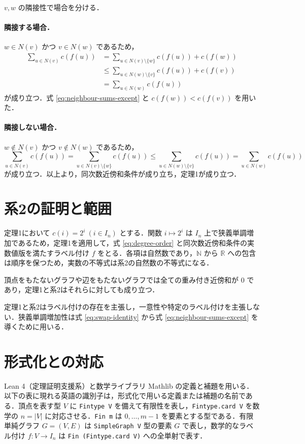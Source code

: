 \documentclass[lualatex,article]{jlreq}
\theoremstyle{jremark}
\begin{document}
$v,w$ の隣接性で場合を分ける．

\paragraph{隣接する場合．}
$w\in N(v)$ かつ $v\in N(w)$ であるため，
\[
\begin{aligned}
  \sum_{u\in N(v)}c(f(u))
  &=\sum_{u\in N(v)\setminus\{w\}}c(f(u))+c(f(w))\\
  &\leq\sum_{u\in N(w)\setminus\{v\}}c(f(u))+c(f(v))\\
  &=\sum_{u\in N(w)}c(f(u))
\end{aligned}
\]
が成り立つ．式 \eqref{eq:neighbour-sums-except} と $c(f(w))<c(f(v))$ を用いた．

\paragraph{隣接しない場合．}
$w\notin N(v)$ かつ $v\notin N(w)$ であるため，
\[
  \sum_{u\in N(v)}c(f(u))
  =\sum_{u\in N(v)\setminus\{w\}}c(f(u))
  \leq\sum_{u\in N(w)\setminus\{v\}}c(f(u))
  =\sum_{u\in N(w)}c(f(u))
\]
が成り立つ．以上より，同次数近傍和条件が成り立ち，定理1が成り立つ．

\section{系2の証明と範囲}

定理1において $c(i)=2^i\ (i\in I_n)$ とする．関数 $i\mapsto2^i$ は $I_n$ 上で狭義単調増加であるため，定理1を適用して，式 \eqref{eq:degree-order} と同次数近傍和条件の実数値版を満たすラベル付け $f$ をとる．各項は自然数であり，$\mathbb N$ から $\mathbb R$ への包含は順序を保つため，実数の不等式は系2の自然数の不等式になる．

頂点をもたないグラフや辺をもたないグラフでは全ての重み付き近傍和が $0$ であり，定理1と系2はそれらに対しても成り立つ．

定理1と系2はラベル付けの存在を主張し，一意性や特定のラベル付けを主張しない．狭義単調増加性は式 \eqref{eq:swap-identity} から式 \eqref{eq:neighbour-sums-except} を導くために用いる．

\section{形式化との対応}

Lean 4（定理証明支援系）と数学ライブラリ Mathlib の定義と補題を用いる．以下の表に現れる英語の識別子は，形式化で用いる定義または補題の名前である．頂点を表す型 $V$ に \texttt{Fintype V} を備えて有限性を表し，\texttt{Fintype.card V} を数学の $n=|V|$ に対応させる．\texttt{Fin m} は $0,\ldots,m-1$ を要素とする型である．有限単純グラフ $G=(V,E)$ は \texttt{SimpleGraph V} 型の要素 $G$ で表し，数学的なラベル付け $f:V\to I_n$ は \texttt{Fin (Fintype.card V)} への全単射で表す．
\end{document}

